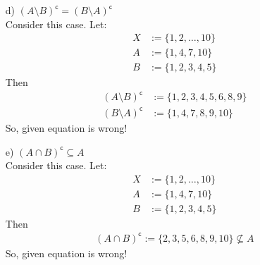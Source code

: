 \begin{enumerate}
\item[d)] $(A\setminus B)^\mathsf{c} = (B\setminus A)^\mathsf{c}$ \\
      Consider this case. Let:
      \begin{align}
            X &:=\{1,2,\dots, 10\} \\
            A &:=\{1,4,7,10\} \\
            B &:=\{1,2,3,4,5\}
      \end{align}
      Then 
      \begin{align}
            (A\setminus B)^\mathsf{c} &:=\{1,2,3,4,5,6,8,9\} \\
            (B\setminus A)^\mathsf{c} &:=\{1,4,7,8,9,10\}
      \end{align}
      So, given equation is wrong!
\newpage
\item[e)] $(A\cap B)^\mathsf{c} \subseteq A$ \\
      Consider this case. Let:
      \begin{align}
            X &:=\{1,2,\dots, 10\} \\
            A &:=\{1,4,7,10\} \\
            B &:=\{1,2,3,4,5\}
      \end{align}
      Then 
      \begin{align}
            (A\cap B)^\mathsf{c} :=\{2,3,5,6,8,9,10\} \nsubseteq A
      \end{align}
      So, given equation is wrong!
\end{enumerate}